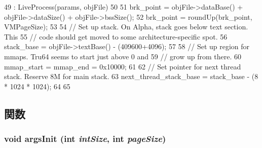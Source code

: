 \begin{DoxyCode}
49     : LiveProcess(params, objFile)
50 {
51     brk_point = objFile->dataBase() + objFile->dataSize() + objFile->bssSize();
52     brk_point = roundUp(brk_point, VMPageSize);
53 
54     // Set up stack.  On Alpha, stack goes below text section.  This
55     // code should get moved to some architecture-specific spot.
56     stack_base = objFile->textBase() - (409600+4096);
57 
58     // Set up region for mmaps.  Tru64 seems to start just above 0 and
59     // grow up from there.
60     mmap_start = mmap_end = 0x10000;
61 
62     // Set pointer for next thread stack.  Reserve 8M for main stack.
63     next_thread_stack_base = stack_base - (8 * 1024 * 1024);
64 
65 }
\end{DoxyCode}


\subsection{関数}
\hypertarget{classAlphaLiveProcess_a60e5314ffeede1e51c6bcb2cf606ca92}{
\subsubsection[{argsInit}]{\setlength{\rightskip}{0pt plus 5cm}void argsInit (int {\em intSize}, \/  int {\em pageSize})}}
\label{classAlphaLiveProcess_a60e5314ffeede1e51c6bcb2cf606ca92}



